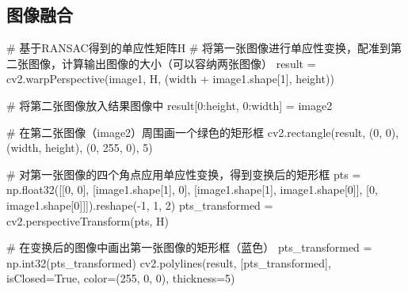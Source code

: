 \documentclass[12pt, a4paper, oneside]{ctexart}
\numberwithin{equation}{section}  %
\begin{document}
\subsection{图像融合}
\vspace{3ex}
\begin{pythoncode}
# 基于RANSAC得到的单应性矩阵H
# 将第一张图像进行单应性变换，配准到第二张图像，计算输出图像的大小（可以容纳两张图像）
result = cv2.warpPerspective(image1, H, (width + image1.shape[1], height))

# 将第二张图像放入结果图像中
result[0:height, 0:width] = image2

# 在第二张图像（image2）周围画一个绿色的矩形框
cv2.rectangle(result, (0, 0), (width, height), (0, 255, 0), 5)

# 对第一张图像的四个角点应用单应性变换，得到变换后的矩形框
pts = np.float32([[0, 0], [image1.shape[1], 0], [image1.shape[1], image1.shape[0]], [0, image1.shape[0]]]).reshape(-1, 1, 2)
pts_transformed = cv2.perspectiveTransform(pts, H)

# 在变换后的图像中画出第一张图像的矩形框（蓝色）
pts_transformed = np.int32(pts_transformed)
cv2.polylines(result, [pts_transformed], isClosed=True, color=(255, 0, 0), thickness=5)
\end{pythoncode}
\end{document}
